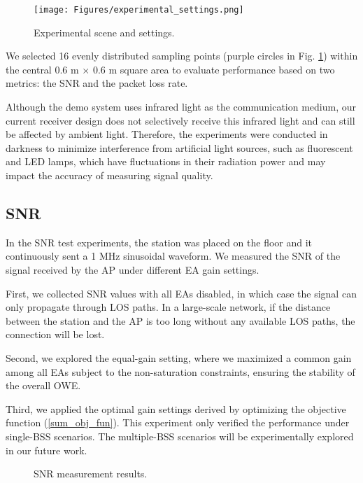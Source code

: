 \begin{figure}
\centering
\texttt{[image: Figures/experimental\_settings.png]}
\caption{Experimental scene and settings.}
\label{experimental_settings}
\vspace{-0.5cm}
\end{figure}

\par
We selected 16 evenly distributed sampling points (purple circles in Fig. \ref{experimental_settings}) within the central 0.6 m $\times$ 0.6 m square area to evaluate performance based on two metrics: the SNR and the packet loss rate.
\par
Although the demo system uses infrared light as the communication medium, our current receiver design does not selectively receive this infrared light and can still be affected by ambient light. Therefore, the experiments were conducted in darkness to minimize interference from artificial light sources, such as fluorescent and LED lamps, which have fluctuations in their radiation power and may impact the accuracy of measuring signal quality.

\subsection{SNR}
In the SNR test experiments, the station was placed on the floor and it continuously sent a 1 MHz sinusoidal waveform. We measured the SNR of the signal received by the AP under different EA gain settings.
\par
First, we collected SNR values with all EAs disabled, in which case the signal can only propagate through LOS paths. In a large-scale network, if the distance between the station and the AP is too long without any available LOS paths, the connection will be lost.
\par
Second, we explored the equal-gain setting, where we maximized a common gain among all EAs subject to the non-saturation constraints, ensuring the stability of the overall OWE.
\par
Third, we applied the optimal gain settings derived by optimizing the objective function (\ref{sum_obj_fun}). This experiment only verified the performance under single-BSS scenarios. The multiple-BSS scenarios will be experimentally explored in our future work.

\begin{figure*}[htbp]
\centering
{}
\caption{SNR measurement results.}
\label{snr_experiments}
\vspace{-0.3cm}
\end{figure*}

